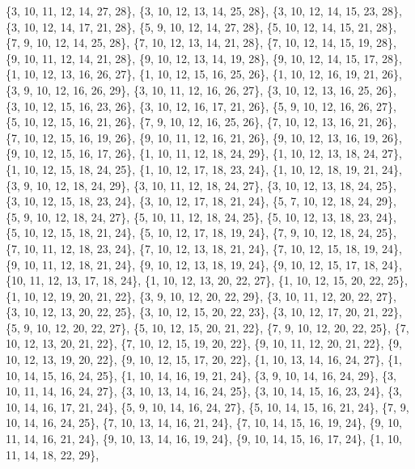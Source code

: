 \documentclass[11pt,a4paper]{article}
\begin{document}
{\{3, 10, 11, 12, 14, 27, 28\}, \{3, 10, 12, 13, 14, 25, 28\}, \{3, 10, 12, 14, 15, 23, 28\}, \{3, 10, 12, 14, 17, 21, 28\}, \{5, 9, 10, 12, 14, 27, 28\},
\{5, 10, 12, 14, 15, 21, 28\}, \{7, 9, 10, 12, 14, 25, 28\}, \{7, 10, 12, 13, 14, 21, 28\}, \{7, 10, 12, 14, 15, 19, 28\}, \{9, 10, 11, 12, 14, 21, 28\},
\{9, 10, 12, 13, 14, 19, 28\}, \{9, 10, 12, 14, 15, 17, 28\}, \{1, 10, 12, 13, 16, 26, 27\}, \{1, 10, 12, 15, 16, 25, 26\}, \{1, 10, 12, 16, 19, 21, 26\},
\{3, 9, 10, 12, 16, 26, 29\}, \{3, 10, 11, 12, 16, 26, 27\}, \{3, 10, 12, 13, 16, 25, 26\}, \{3, 10, 12, 15, 16, 23, 26\}, \{3, 10, 12, 16, 17, 21, 26\},
\{5, 9, 10, 12, 16, 26, 27\}, \{5, 10, 12, 15, 16, 21, 26\}, \{7, 9, 10, 12, 16, 25, 26\}, \{7, 10, 12, 13, 16, 21, 26\}, \{7, 10, 12, 15, 16, 19, 26\},
\{9, 10, 11, 12, 16, 21, 26\}, \{9, 10, 12, 13, 16, 19, 26\}, \{9, 10, 12, 15, 16, 17, 26\}, \{1, 10, 11, 12, 18, 24, 29\}, \{1, 10, 12, 13, 18, 24, 27\},
\{1, 10, 12, 15, 18, 24, 25\}, \{1, 10, 12, 17, 18, 23, 24\}, \{1, 10, 12, 18, 19, 21, 24\}, \{3, 9, 10, 12, 18, 24, 29\}, \{3, 10, 11, 12, 18, 24, 27\},
\{3, 10, 12, 13, 18, 24, 25\}, \{3, 10, 12, 15, 18, 23, 24\}, \{3, 10, 12, 17, 18, 21, 24\}, \{5, 7, 10, 12, 18, 24, 29\}, \{5, 9, 10, 12, 18, 24, 27\},
\{5, 10, 11, 12, 18, 24, 25\}, \{5, 10, 12, 13, 18, 23, 24\}, \{5, 10, 12, 15, 18, 21, 24\}, \{5, 10, 12, 17, 18, 19, 24\}, \{7, 9, 10, 12, 18, 24, 25\},
\{7, 10, 11, 12, 18, 23, 24\}, \{7, 10, 12, 13, 18, 21, 24\}, \{7, 10, 12, 15, 18, 19, 24\}, \{9, 10, 11, 12, 18, 21, 24\}, \{9, 10, 12, 13, 18, 19, 24\},
\{9, 10, 12, 15, 17, 18, 24\}, \{10, 11, 12, 13, 17, 18, 24\}, \{1, 10, 12, 13, 20, 22, 27\}, \{1, 10, 12, 15, 20, 22, 25\}, \{1, 10, 12, 19, 20, 21, 22\},
\{3, 9, 10, 12, 20, 22, 29\}, \{3, 10, 11, 12, 20, 22, 27\}, \{3, 10, 12, 13, 20, 22, 25\}, \{3, 10, 12, 15, 20, 22, 23\}, \{3, 10, 12, 17, 20, 21, 22\},
\{5, 9, 10, 12, 20, 22, 27\}, \{5, 10, 12, 15, 20, 21, 22\}, \{7, 9, 10, 12, 20, 22, 25\}, \{7, 10, 12, 13, 20, 21, 22\}, \{7, 10, 12, 15, 19, 20, 22\},
\{9, 10, 11, 12, 20, 21, 22\}, \{9, 10, 12, 13, 19, 20, 22\}, \{9, 10, 12, 15, 17, 20, 22\}, \{1, 10, 13, 14, 16, 24, 27\}, \{1, 10, 14, 15, 16, 24, 25\},
\{1, 10, 14, 16, 19, 21, 24\}, \{3, 9, 10, 14, 16, 24, 29\}, \{3, 10, 11, 14, 16, 24, 27\}, \{3, 10, 13, 14, 16, 24, 25\}, \{3, 10, 14, 15, 16, 23, 24\},
\{3, 10, 14, 16, 17, 21, 24\}, \{5, 9, 10, 14, 16, 24, 27\}, \{5, 10, 14, 15, 16, 21, 24\}, \{7, 9, 10, 14, 16, 24, 25\}, \{7, 10, 13, 14, 16, 21, 24\},
\{7, 10, 14, 15, 16, 19, 24\}, \{9, 10, 11, 14, 16, 21, 24\}, \{9, 10, 13, 14, 16, 19, 24\}, \{9, 10, 14, 15, 16, 17, 24\}, \{1, 10, 11, 14, 18, 22, 29\},
}
\end{document}
